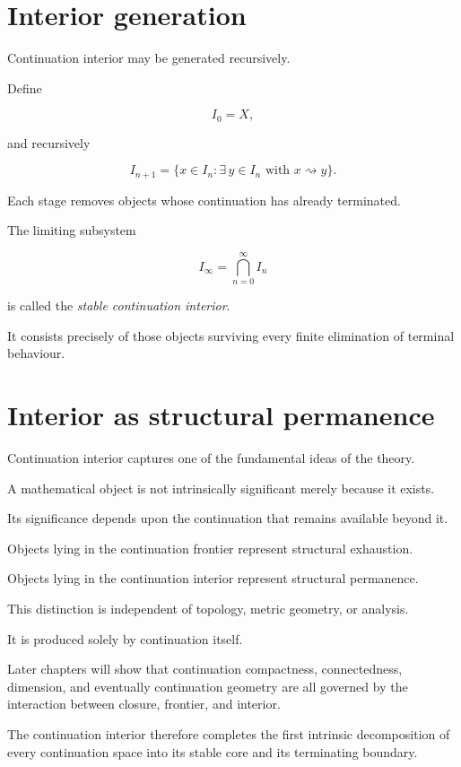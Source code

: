 \documentclass[13pt,openany]{book}
\theoremstyle{plain}
\theoremstyle{definition}
\begin{document}
\section{Interior generation}

Continuation interior may be generated recursively.

Define

\[
I_0=X,
\]

and recursively

\[
I_{n+1}
=
\{
x\in I_n:
\exists\,y\in I_n
\text{ with }
x\rightsquigarrow y
\}.
\]

Each stage removes objects whose continuation has already terminated.

The limiting subsystem

\[
I_\infty
=
\bigcap_{n=0}^{\infty}
I_n
\]

is called the \emph{stable continuation interior}.

It consists precisely of those objects surviving every finite elimination of
terminal behaviour.


\section{Interior as structural permanence}

Continuation interior captures one of the fundamental ideas of the theory.

A mathematical object is not intrinsically significant merely because it
exists.

Its significance depends upon the continuation that remains available beyond
it.

Objects lying in the continuation frontier represent structural exhaustion.

Objects lying in the continuation interior represent structural permanence.

This distinction is independent of topology, metric geometry, or analysis.

It is produced solely by continuation itself.

Later chapters will show that continuation compactness, connectedness,
dimension, and eventually continuation geometry are all governed by the
interaction between closure, frontier, and interior.

The continuation interior therefore completes the first intrinsic
decomposition of every continuation space into its stable core and its
terminating boundary.
\end{document}
